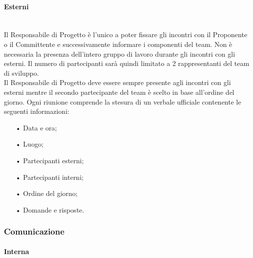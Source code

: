 \paragraph{Esterni}\mbox{}\\
Il Responsabile di Progetto è l'unico a poter fissare gli incontri con il Proponente o il Committente e successivamente informare i componenti del team. Non è necessaria la presenza dell'intero gruppo di lavoro durante gli incontri con gli esterni. Il numero di partecipanti sarà quindi limitato a 2 rappresentanti del team di sviluppo.  
\\
Il Responsabile di Progetto deve essere sempre presente agli incontri con gli esterni mentre il secondo partecipante del team è scelto in base all'ordine del giorno. 
\newline
% 
Ogni riunione comprende la stesura di un verbale ufficiale contenente le seguenti informazioni:
\begin{itemize}
\item[•] Data e ora;
\item[•] Luogo;
\item[•] Partecipanti esterni;
\item[•] Partecipanti interni;
\item[•] Ordine del giorno;
\item[•] Domande e risposte.
\end{itemize}

\subsubsection{Comunicazione}

\paragraph{Interna}\mbox{}\\

